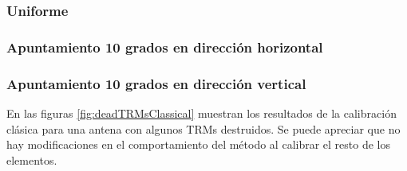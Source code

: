 \subsubsection{Uniforme}

\subsubsection{Apuntamiento 10 grados en dirección horizontal}

\subsubsection{Apuntamiento 10 grados en dirección vertical}


En las figuras \ref{fig:deadTRMsClassical} muestran los resultados de la calibración clásica para una antena con algunos TRMs destruidos. 
Se puede apreciar que no hay modificaciones en el comportamiento del método al calibrar el resto de los elementos.

